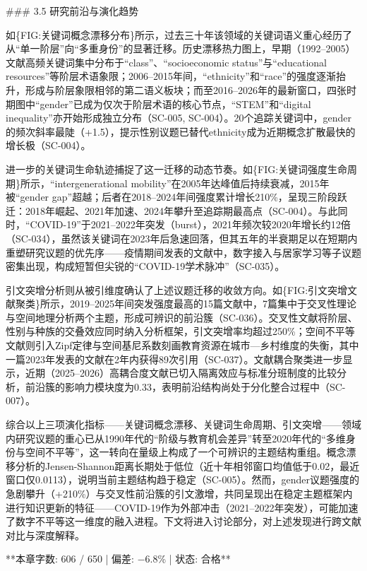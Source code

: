 \documentclass[12pt,a4paper]{article}
\begin{document}
\#\#\# 3.5 研究前沿与演化趋势

如\{FIG:关键词概念漂移分布\}所示，过去三十年该领域的关键词语义重心经历了从“单一阶层”向“多重身份”的显著迁移。历史漂移热力图上，早期（1992–2005）文献高频关键词集中分布于“class”、“socioeconomic status”与“educational resources”等阶层术语象限；2006–2015年间，“ethnicity”和“race”的强度逐渐抬升，形成与阶层象限相邻的第二语义板块；而至2016–2026年的最新窗口，四张时期图中“gender”已成为仅次于阶层术语的核心节点，“STEM”和“digital inequality”亦开始形成独立分布（SC-005, SC-004）。20个追踪关键词中，gender的频次斜率最陡（+1.5），提示性别议题已替代ethnicity成为近期概念扩散最快的增长极（SC-004）。

进一步的关键词生命轨迹捕捉了这一迁移的动态节奏。如\{FIG:关键词强度生命周期\}所示，“intergenerational mobility”在2005年达峰值后持续衰减，2015年被“gender gap”超越；后者在2018–2024年间强度累计增长210\%，呈现三阶段跃迁：2018年崛起、2021年加速、2024年攀升至追踪期最高点（SC-004）。与此同时，“COVID-19”于2021–2022年突发（burst），2021年频次较2020年增长约12倍（SC-034），虽然该关键词在2023年后急速回落，但其五年的半衰期足以在短期内重塑研究议题的优先序——疫情期间发表的文献中，数字接入与居家学习等子议题密集出现，构成短暂但尖锐的“COVID-19学术脉冲”（SC-035）。

引文突增分析则从被引维度确认了上述议题迁移的收敛方向。如\{FIG:引文突增文献聚类\}所示，2019–2025年间突发强度最高的15篇文献中，7篇集中于交叉性理论与空间地理分析两个主题，形成可辨识的前沿簇（SC-036）。交叉性文献将阶层、性别与种族的交叠效应同时纳入分析框架，引文突增率均超过250\%；空间不平等文献则引入Zipf定律与空间基尼系数刻画教育资源在城市—乡村维度的失衡，其中一篇2023年发表的文献在2年内获得89次引用（SC-037）。文献耦合聚类进一步显示，近期（2025–2026）高耦合度文献已切入隔离效应与标准分班制度的比较分析，前沿簇的影响力模块度为0.33，表明前沿结构尚处于分化整合过程中（SC-007）。

综合以上三项演化指标——关键词概念漂移、关键词生命周期、引文突增——领域内研究议题的重心已从1990年代的“阶级与教育机会差异”转至2020年代的“多维身份与空间不平等”，这一转向在量级上构成了一个可辨识的主题结构重组。概念漂移分析的Jensen-Shannon距离长期处于低位（近十年相邻窗口均值低于0.02，最近窗口仅0.0113），说明当前主题结构趋于稳定（SC-005）。然而，gender议题强度的急剧攀升（+210\%）与交叉性前沿簇的引文激增，共同呈现出在稳定主题框架内进行知识更新的特征——COVID-19作为外部冲击（2021–2022年突发），可能加速了数字不平等这一维度的融入进程。下文将进入讨论部分，对上述发现进行跨文献对比与深度解释。

**本章字数: 606 / 650 | 偏差: −6.8\% | 状态: 合格**
\end{document}

